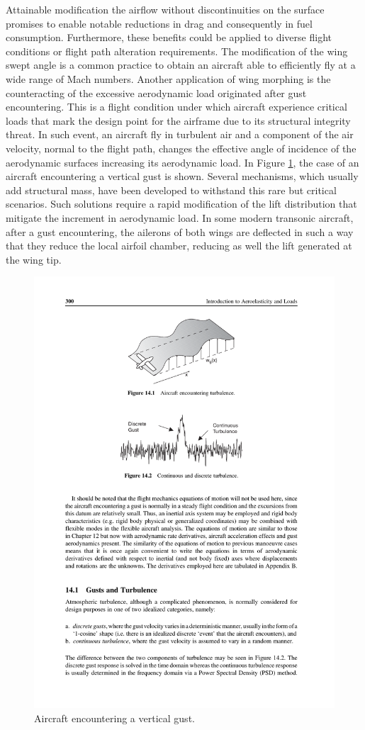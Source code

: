 Attainable modification the airflow without discontinuities on the surface promises to enable notable reductions in drag and consequently in fuel consumption. Furthermore, these benefits could be applied to diverse flight conditions or flight path alteration requirements. The modification of the wing swept angle is a common practice to obtain an aircraft able to efficiently fly at a wide range of Mach numbers. Another application of wing morphing is the counteracting of the excessive aerodynamic load originated after gust encountering. This is a flight condition under which aircraft experience critical loads that mark the design point for the airframe due to its structural integrity threat. In such event, an aircraft fly in turbulent air and a component of the air velocity, normal to the flight path, changes the effective angle of incidence of the aerodynamic surfaces increasing its aerodynamic load. In Figure \ref{fig:gust}, the case of an aircraft encountering a vertical gust is shown. Several mechanisms, which usually add structural mass, have been developed to withstand this rare but critical scenarios. Such solutions require a rapid modification of the lift distribution that mitigate the increment in aerodynamic load. In some modern transonic aircraft, after a gust encountering, the ailerons of both wings are deflected in such a way that they reduce the local airfoil chamber, reducing as well the lift generated at the wing tip.

\begin{figure}[!htpb]
  \centering
  \includegraphics[width=0.7 \textwidth]{figures/state-of-the-art/gust}
  \caption[Aircraft encountering a vertical gust]{Aircraft encountering a vertical gust. \cite{JECooper2007}}\label{fig:gust}
\end{figure}

